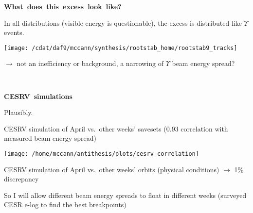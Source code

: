 \documentclass[landscape]{article}
\newenvironment{slide}[1][ ]{\mbox{\boldmath \bf #1 } \vfill}{\vfill \mbox{ } \pagebreak}
\begin{document}
\begin{slide}[What does this excess look like?]

In all distributions (visible energy is questionable), the excess is
distributed like $\Upsilon$ events.

\vfill
\begin{center}
  \texttt{[image: /cdat/daf9/mccann/synthesis/rootstab\_home/rootstab9\_tracks]}
\end{center}

$\rightarrow$ not an inefficiency or background, a narrowing of $\Upsilon$ beam energy spread?

\end{slide}

\begin{slide}[CESRV simulations]

Plausibly.

\vfill CESRV simulation of April vs.\ other weeks' savesets (0.93
correlation with measured beam energy spread)

\begin{center}
  \texttt{[image: /home/mccann/antithesis/plots/cesrv\_correlation]}
\end{center}

\vfill CESRV simulation of April vs.\ other weeks' orbits (physical
conditions) $\to$ 1\% discrepancy

\vfill So I will allow different beam energy spreads to float in
different weeks (surveyed CESR e-log to find the best breakpoints)

\end{slide}
\end{document}
